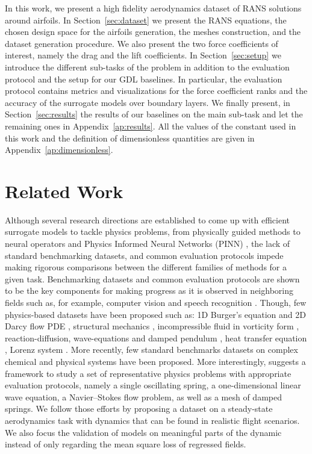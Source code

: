 In this work, we present a high fidelity aerodynamics dataset of RANS solutions around airfoils. In Section~\ref{sec:dataset} we present the RANS equations, the chosen design space for the airfoils generation, the meshes construction, and the dataset generation procedure. We also present the two force coefficients of interest, namely the drag and the lift coefficients. In Section~\ref{sec:setup} we introduce the different sub-tasks of the problem in addition to the evaluation protocol and the setup for our GDL baselines. In particular, the evaluation protocol contains metrics and visualizations for the force coefficient ranks and the accuracy of the surrogate models over boundary layers. We finally present, in Section~\ref{sec:results} the results of our baselines on the main sub-task and let the remaining ones in Appendix~\ref{ap:results}. All the values of the constant used in this work and the definition of dimensionless quantities are given in Appendix~\ref{ap:dimensionless}.

\section{Related Work}\label{sec:related_works}
Although several research directions are established to come up with efficient surrogate models to tackle physics problems, from physically guided methods \cite{de2018deep,Chen2020,dgm,pmlr-v80-long18a,brandstetter2022lie} to neural operators \cite{mgno,Kovachki2021NeuralOL,fno,lu2021learning} and Physics Informed Neural Networks (PINN) \cite{pinns}, the lack of standard benchmarking datasets, and common evaluation protocols impede making rigorous comparisons between the different families of methods for a given task. Benchmarking datasets and common evaluation protocols are shown to be the key components for making progress as it is observed in neighboring fields such as, for example, computer vision \cite{imagenet,Smaira2020ASN} and speech recognition \cite{pmlr-v48-amodei16}. Though, few physics-based datasets have been proposed  such as: 1D Burger’s equation and  2D Darcy flow PDE \cite{mgno}, structural mechanics \cite{pfaff2021learning}, incompressible fluid in vorticity form \cite{fno}, reaction-diffusion, wave-equations and damped pendulum \cite{yin:hal-03137025}, heat transfer equation \cite{DBLP:journals/corr/abs-2010-02011}, Lorenz system \cite{dubois:hal-02475962}. More recently, few standard benchmarks datasets on complex chemical and physical systems \cite{atom3d,du2021graphgt,freitas2021a,freeman2021brax,gilpin2021chaos} have been proposed. More interestingly, \cite{otness2021an} suggests a framework to study a set of representative physics problems with appropriate evaluation protocols, namely a single oscillating spring, a one-dimensional linear wave equation, a Navier–Stokes flow problem, as well as a mesh of damped springs. We follow those efforts by proposing a dataset on a steady-state aerodynamics task with dynamics that can be found in realistic flight scenarios. We also focus the validation of models on meaningful parts of the dynamic instead of only regarding the mean square loss of regressed fields. 

